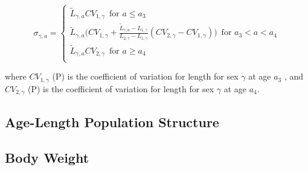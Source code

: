 \documentclass[11pt,
  english,
  letterpaper,
]{article}
\begin{document}
\begin{equation}
\label{eqn12}
\sigma_{\gamma, a} = 
\begin{cases}
\tilde{L}_{\gamma,a}CV_{1,\gamma} \;\ \text{for $a \leq a_3$} \\
\tilde{L}_{\gamma,a}\biggl(CV_{1,\gamma} + \frac{\tilde{L}_{\gamma,a} - L_{1,\gamma}}{L_{2,\gamma} - L_{1,\gamma}}(CV_{2,\gamma} - CV_{1,\gamma})\biggr) \;\ \text{for $a_3 < a < a_4$}\\
\tilde{L}_{\gamma,a}CV_{2,\gamma} \;\ \text{for $a \geq a_4$} \\
\end{cases}
\end{equation}

\leavevmode\tagmcend\tagstructend\par


where {\(CV_{1,\gamma}\)\leavevmode\tagmcend\tagstructend} (P) is the coefficient of variation for length for sex {\(\gamma\)\leavevmode\tagmcend\tagstructend} at age {\(a_3\)\leavevmode\tagmcend\tagstructend} , and {\(CV_{2,\gamma}\)\leavevmode\tagmcend\tagstructend} (P) is the coefficient of variation for length for sex {\(\gamma\)\leavevmode\tagmcend\tagstructend} at age {\(a_4\)\leavevmode\tagmcend\tagstructend}.

\leavevmode\tagmcend\tagstructend\par


\hypertarget{age-length-population-structure}{%
\subsection{Age-Length Population Structure}\label{age-length-population-structure}}

\leavevmode\tagmcend\tagstructend


\hypertarget{body-weight}{%
\subsection{Body Weight}\label{body-weight}}
\end{document}
